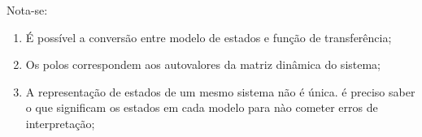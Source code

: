 \documentclass{article}
\begin{document}
\newpage\begin{remark}\label{ex9}
    Nota-se:
    \begin{enumerate}
        \item É possível a conversão entre modelo de estados e função de transferência;
        \item Os polos correspondem aos autovalores da matriz dinâmica do sistema;
        \item A representação de estados de um mesmo sistema não é única. é preciso saber o que significam os estados em cada modelo para nào cometer erros de interpretação;
    \end{enumerate}
\end{remark}
\end{document}

